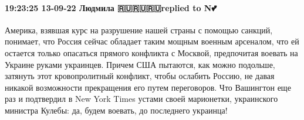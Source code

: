\paragraph{19:23:25 13-09-22 Людмила 🇷🇺🇷🇺🇷🇺replied to N💕🌹}

Америка, взявшая курс на разрушение нашей страны с помощью санкций, понимает, что Россия сейчас обладает таким мощным военным арсеналом, что ей остается только опасаться прямого конфликта с Москвой, предпочитая воевать на Украине руками украинцев.
Причем США пытаются, как можно подольше, затянуть этот кровопролитный конфликт, чтобы ослабить Россию, не давая никакой возможности прекращения его путем переговоров. Что Вашингтон еще раз и подтвердил в New York Times устами своей марионетки, украинского министра Кулебы: да, будем воевать, до последнего украинца!

